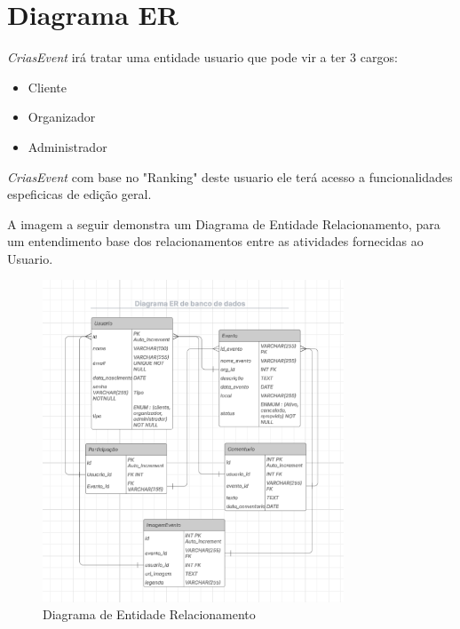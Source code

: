 \section{Diagrama ER}
\textit{CriasEvent} irá tratar uma entidade usuario que pode vir a ter 3 cargos:
\begin{itemize}
    \item Cliente
    \item Organizador
    \item Administrador
\end{itemize}
\textit{CriasEvent} com base no "Ranking" deste usuario ele terá acesso a funcionalidades espeficicas de edição geral. \par
A imagem a seguir demonstra um Diagrama de Entidade Relacionamento, para um entendimento base dos relacionamentos entre as atividades fornecidas ao Usuario.
\begin{figure}[h]
  \centering
  \includegraphics[width=0.8\textwidth]{images/diagrama_ER.png}
  \caption{Diagrama de Entidade Relacionamento}
  \label{fig:diagram_Entity_Relatioship}
\end{figure}

